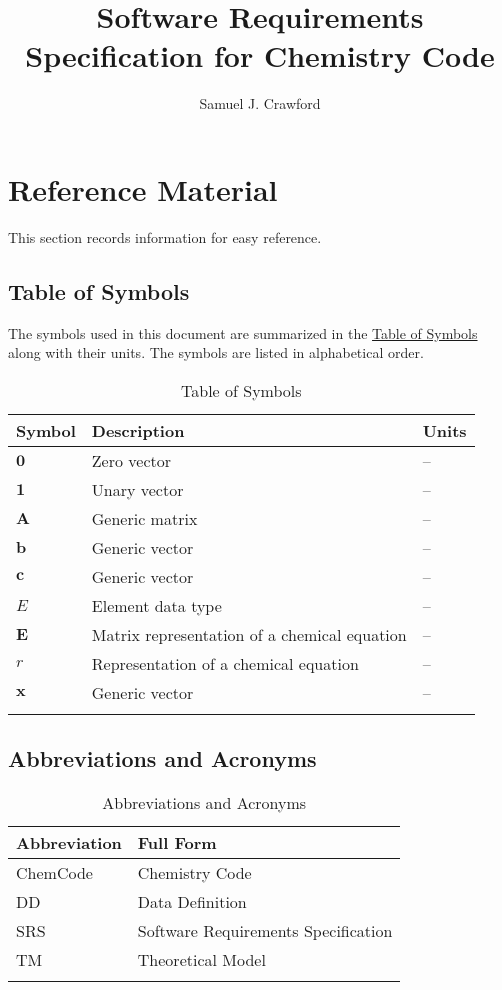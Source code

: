 \documentclass[12pt]{article}
\title{Software Requirements Specification for Chemistry Code}
\author{Samuel J. Crawford}
\begin{document}
\maketitle
\tableofcontents
\newpage
\section{Reference Material}
\label{Sec:RefMat}
This section records information for easy reference.

\subsection{Table of Symbols}
\label{Sec:ToS}
The symbols used in this document are summarized in the \hyperref[Table:ToS]{Table of Symbols} along with their units. The symbols are listed in alphabetical order.

\begin{longtable}{l l l}
\toprule
\textbf{Symbol} & \textbf{Description} & \textbf{Units}
\\
\midrule
\endhead
$\symbf{0}$ & Zero vector & --
\\
$\symbf{1}$ & Unary vector & --
\\
$\symbf{A}$ & Generic matrix & --
\\
$\symbf{b}$ & Generic vector & --
\\
$\symbf{c}$ & Generic vector & --
\\
$E$ & Element data type & --
\\
$\symbf{E}$ & Matrix representation of a chemical equation & --
\\
$r$ & Representation of a chemical equation & --
\\
$\symbf{x}$ & Generic vector & --
\\
\bottomrule
\caption{Table of Symbols}
\label{Table:ToS}
\end{longtable}
\subsection{Abbreviations and Acronyms}
\label{Sec:TAbbAcc}
\begin{longtable}{l l}
\toprule
\textbf{Abbreviation} & \textbf{Full Form}
\\
\midrule
\endhead
ChemCode & Chemistry Code
\\
DD & Data Definition
\\
SRS & Software Requirements Specification
\\
TM & Theoretical Model
\\
\bottomrule
\caption{Abbreviations and Acronyms}
\label{Table:TAbbAcc}
\end{longtable}
\end{document}
